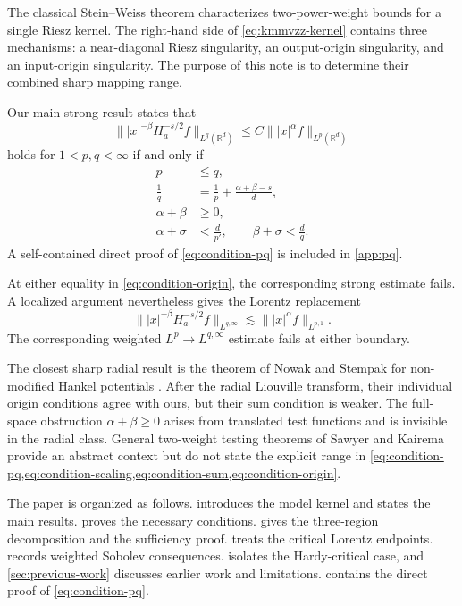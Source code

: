 \documentclass[11pt]{amsart}
\numberwithin{equation}{section}
\theoremstyle{plain}
\theoremstyle{definition}
\theoremstyle{remark}
\newcommand{\RR}{\mathbb{R}}
\newcommand{\Ha}{H_a}
\begin{document}
The classical Stein--Weiss theorem \cite{SteinWeiss1958} characterizes two-power-weight bounds for a single Riesz kernel. The right-hand side of \cref{eq:kmmvzz-kernel} contains three mechanisms: a near-diagonal Riesz singularity, an output-origin singularity, and an input-origin singularity. The purpose of this note is to determine their combined sharp mapping range.

Our main strong result states that
\begin{equation}
 \bigl\||x|^{-\beta}\Ha^{-s/2}f\bigr\|_{L^q(\RR^d)}
 \le C
 \bigl\||x|^\alpha f\bigr\|_{L^p(\RR^d)}
 \label{eq:main-estimate}
\end{equation}
holds for $1<p,q<\infty$ if and only if
\begin{align}
 p&\le q,
 \label{eq:condition-pq}\\
 \frac1q&=\frac1p+\frac{\alpha+\beta-s}{d},
 \label{eq:condition-scaling}\\
 \alpha+\beta&\ge0,
 \label{eq:condition-sum}\\
 \alpha+\sigma&<\frac d{p'},
 \qquad
 \beta+\sigma<\frac d q.
 \label{eq:condition-origin}
\end{align}
A self-contained direct proof of \cref{eq:condition-pq} is included in \cref{app:pq}.

At either equality in \cref{eq:condition-origin}, the corresponding strong estimate fails. A localized argument nevertheless gives the Lorentz replacement
\begin{equation}
 \bigl\||x|^{-\beta}\Ha^{-s/2}f\bigr\|_{L^{q,\infty}}
 \lesssim
 \bigl\||x|^\alpha f\bigr\|_{L^{p,1}}.
 \label{eq:endpoint-introduction}
\end{equation}
The corresponding weighted $L^p\to L^{q,\infty}$ estimate fails at either boundary.

The closest sharp radial result is the theorem of Nowak and Stempak for non-modified Hankel potentials \cite[Theorem~2.10]{NowakStempak2017}. After the radial Liouville transform, their individual origin conditions agree with ours, but their sum condition is weaker. The full-space obstruction $\alpha+\beta\ge0$ arises from translated test functions and is invisible in the radial class. General two-weight testing theorems of Sawyer and Kairema \cite{Sawyer1988,Kairema2013} provide an abstract context but do not state the explicit range in \cref{eq:condition-pq,eq:condition-scaling,eq:condition-sum,eq:condition-origin}.

The paper is organized as follows.  introduces the model kernel and states the main results.  proves the necessary conditions.  gives the three-region decomposition and the sufficiency proof.  treats the critical Lorentz endpoints.  records weighted Sobolev consequences.  isolates the Hardy-critical case, and \cref{sec:previous-work} discusses earlier work and limitations.  contains the direct proof of \cref{eq:condition-pq}.
\end{document}
